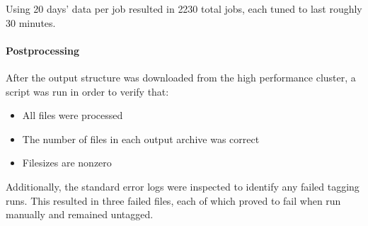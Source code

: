 Using 20 days' data per job resulted in 2230 total jobs, each tuned to last roughly 30 minutes.


\paragraph{Postprocessing}
After the output structure was downloaded from the high performance cluster, a script was run in order to verify that:

\begin{itemize}
    \item All files were processed
    \item The number of files in each output archive was correct
    \item Filesizes are nonzero
\end{itemize}

Additionally, the standard error logs were inspected to identify any failed tagging runs.  This resulted in three failed files, each of which proved to fail when run manually and remained untagged.

